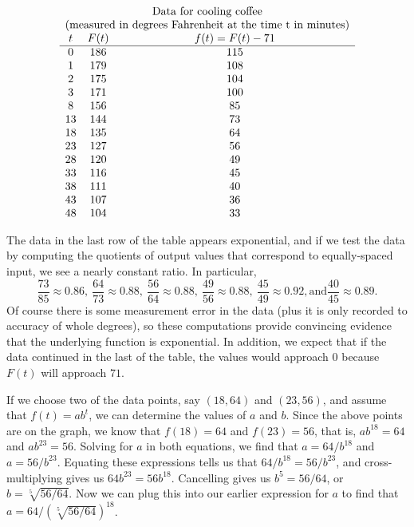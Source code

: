 \documentclass[nooutcomes]{ximera}
\begin{document}
$$
\begin{array}{ccc}
\multicolumn{3}{c}{\text{Data for cooling coffee}}\\
\multicolumn{3}{c}{\text{(measured in degrees Fahrenheit at the time t in minutes)}}\\
t&F(t)&f(t)=F(t)-71\\
\hline
0&186&115\\
1&179&108\\
2&175&104\\
3&171&100\\
8&156&85\\
13&144&73\\
18&135&64\\
23&127&56\\
28&120&49\\
33&116&45\\
38&111&40\\
43&107&36\\
48&104&33
\end{array}
$$

The data in the last row of the table appears exponential, and if we test the data by computing the quotients of output values that correspond to equally-spaced input, we see a nearly constant ratio.  In particular,%
\begin{equation*}
\frac{73}{85} \approx 0.86, \ \frac{64}{73} \approx 0.88, \ \frac{56}{64} \approx 0.88, \ \frac{49}{56} \approx 0.88, \ \frac{45}{49} \approx 0.92, \text{and} \frac{40}{45} \approx 0.89 \text{.}
\end{equation*}
Of course there is some measurement error in the data (plus it is only recorded to accuracy of whole degrees), so these computations provide convincing evidence that the underlying function is exponential.  In addition, we expect that if the data continued in the last of the table, the values would approach $0$ because $F(t)$ will approach $71$.

If we choose two of the data points, say $(18,64)$ and $(23,56)$, and assume that $f(t) = ab^t$, we can determine the values of $a$ and $b$. Since the above points are on the graph, we know that $f(18) = 64$ and $f(23) = 56$, that is, $ab^{18} = 64$ and $ab^{23} = 56$. Solving for $a$ in both equations, we find that $a = 64/b^{18}$ and $a = 56/b^{23}$. Equating these expressions tells us that $64/b^{18} = 56/b^{23}$, and cross-multiplying gives us $64b^{23} = 56b^{18}$. Cancelling gives us $b^5 = 56/64$, or $b = \sqrt[5]{56/64}$. Now we can plug this into our earlier expression for $a$ to find that $a = 64/(\sqrt[5]{56/64})^{18}$.
\end{document}
